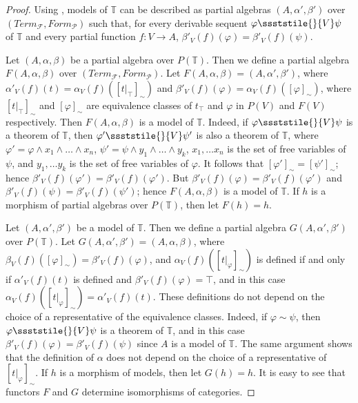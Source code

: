 \begin{proof}
Using , models of $\mathbb{T}$ can be described as partial algebras $(A,\alpha',\beta')$ over $(Term_\mathcal{F},Form_\mathcal{P})$
    such that, for every derivable sequent $\varphi \ssststile{}{V} \psi$ of $\mathbb{T}$ and every partial function $f : V \to A$, $\beta'_V(f)(\varphi) = \beta'_V(f)(\psi)$.

Let $(A,\alpha,\beta)$ be a partial algebra over $P(\mathbb{T})$.
Then we define a partial algebra $F(A,\alpha,\beta)$ over $(Term_\mathcal{F},Form_\mathcal{P})$.
Let $F(A,\alpha,\beta) = (A,\alpha',\beta')$, where $\alpha'_V(f)(t) = \alpha_V(f)([t|_\top]_\sim)$ and $\beta'_V(f)(\varphi) = \alpha_V(f)([\varphi]_\sim)$,
    where $[t|_\top]_\sim$ and $[\varphi]_\sim$ are equivalence classes of $t_\top$ and $\varphi$ in $P(V)$ and $F(V)$ respectively.
Then $F(A,\alpha,\beta)$ is a model of $\mathbb{T}$.
Indeed, if $\varphi \ssststile{}{V} \psi$ is a theorem of $\mathbb{T}$, then $\varphi' \ssststile{}{V} \psi'$
    is also a theorem of $\mathbb{T}$, where $\varphi' = \varphi \land x_1 \land \ldots \land x_n$, $\psi' = \psi \land y_1 \land \ldots \land y_k$,
    $x_1, \ldots x_n$ is the set of free variables of $\psi$, and $y_1, \ldots y_k$ is the set of free variables of $\varphi$.
It follows that $[\varphi']_\sim = [\psi']_\sim$; hence $\beta'_V(f)(\varphi') = \beta'_V(f)(\varphi')$.
But $\beta'_V(f)(\varphi) = \beta'_V(f)(\varphi')$ and $\beta'_V(f)(\psi) = \beta'_V(f)(\psi')$; hence $F(A,\alpha,\beta)$ is a model of $\mathbb{T}$.
If $h$ is a morphism of partial algebras over $P(\mathbb{T})$, then let $F(h) = h$.

Let $(A,\alpha',\beta')$ be a model of $\mathbb{T}$.
Then we define a partial algebra $G(A,\alpha',\beta')$ over $P(\mathbb{T})$.
Let $G(A,\alpha',\beta') = (A,\alpha,\beta)$, where $\beta_V(f)([\varphi]_\sim) = \beta'_V(f)(\varphi)$, and $\alpha_V(f)([t|_\varphi]_\sim)$ is defined
    if and only if $\alpha'_V(f)(t)$ is defined and $\beta'_V(f)(\varphi) = \top$, and in this case $\alpha_V(f)([t|_\varphi]_\sim) = \alpha'_V(f)(t)$.
These definitions do not depend on the choice of a representative of the equivalence classes.
Indeed, if $\varphi \sim \psi$, then $\varphi \ssststile{}{V} \psi$ is a theorem of $\mathbb{T}$,
    and in this case $\beta'_V(f)(\varphi) = \beta'_V(f)(\psi)$ since $A$ is a model of $\mathbb{T}$.
The same argument shows that the definition of $\alpha$ does not depend on the choice of a representative of $[t|_\varphi]_\sim$.
If $h$ is a morphism of models, then let $G(h) = h$.
It is easy to see that functors $F$ and $G$ determine isomorphisms of categories.
\end{proof}

